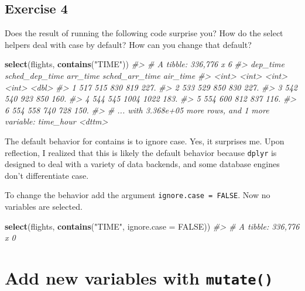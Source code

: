 \documentclass[]{book}
\newenvironment{Shaded}{\begin{snugshade}}{\end{snugshade}}
\newcommand{\CommentTok}[1]{\textcolor[rgb]{0.56,0.35,0.01}{\textit{#1}}}
\newcommand{\DataTypeTok}[1]{\textcolor[rgb]{0.13,0.29,0.53}{#1}}
\newcommand{\KeywordTok}[1]{\textcolor[rgb]{0.13,0.29,0.53}{\textbf{#1}}}
\newcommand{\NormalTok}[1]{#1}
\newcommand{\OtherTok}[1]{\textcolor[rgb]{0.56,0.35,0.01}{#1}}
\newcommand{\StringTok}[1]{\textcolor[rgb]{0.31,0.60,0.02}{#1}}
\theoremstyle{definition}
\theoremstyle{definition}
\theoremstyle{definition}
\theoremstyle{remark}
\begin{document}
\hypertarget{exercise-4-2}{%
\subsection{Exercise 4}\label{exercise-4-2}}

Does the result of running the following code surprise you? How do the
select helpers deal with case by default? How can you change that
default?

\begin{Shaded}
\begin{Highlighting}[]
\KeywordTok{select}\NormalTok{(flights, }\KeywordTok{contains}\NormalTok{(}\StringTok{"TIME"}\NormalTok{))}
\CommentTok{#> # A tibble: 336,776 x 6}
\CommentTok{#>   dep_time sched_dep_time arr_time sched_arr_time air_time}
\CommentTok{#>      <int>          <int>    <int>          <int>    <dbl>}
\CommentTok{#> 1      517            515      830            819     227.}
\CommentTok{#> 2      533            529      850            830     227.}
\CommentTok{#> 3      542            540      923            850     160.}
\CommentTok{#> 4      544            545     1004           1022     183.}
\CommentTok{#> 5      554            600      812            837     116.}
\CommentTok{#> 6      554            558      740            728     150.}
\CommentTok{#> # ... with 3.368e+05 more rows, and 1 more variable: time_hour <dttm>}
\end{Highlighting}
\end{Shaded}

The default behavior for contains is to ignore case. Yes, it surprises
me. Upon reflection, I realized that this is likely the default behavior
because \texttt{dplyr} is designed to deal with a variety of data
backends, and some database engines don't differentiate case.

To change the behavior add the argument \texttt{ignore.case\ =\ FALSE}.
Now no variables are selected.

\begin{Shaded}
\begin{Highlighting}[]
\KeywordTok{select}\NormalTok{(flights, }\KeywordTok{contains}\NormalTok{(}\StringTok{"TIME"}\NormalTok{, }\DataTypeTok{ignore.case =} \OtherTok{FALSE}\NormalTok{))}
\CommentTok{#> # A tibble: 336,776 x 0}
\end{Highlighting}
\end{Shaded}

\hypertarget{add-new-variables-with-mutate}{%
\section{\texorpdfstring{Add new variables with
\texttt{mutate()}}{Add new variables with mutate()}}\label{add-new-variables-with-mutate}}
\end{document}
